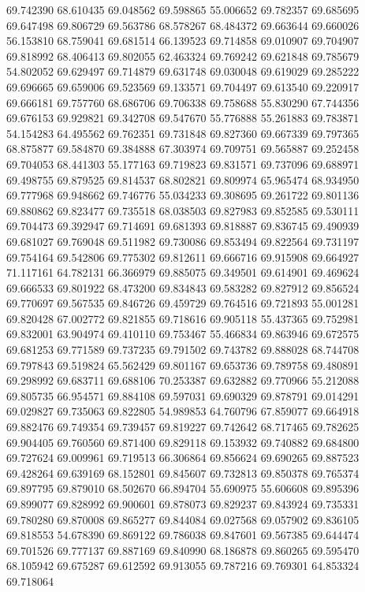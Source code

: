 69.742390
68.610435
69.048562
69.598865
55.006652
69.782357
69.685695
69.647498
69.806729
69.563786
68.578267
68.484372
69.663644
69.660026
56.153810
68.759041
69.681514
66.139523
69.714858
69.010907
69.704907
69.818992
68.406413
69.802055
62.463324
69.769242
69.621848
69.785679
54.802052
69.629497
69.714879
69.631748
69.030048
69.619029
69.285222
69.696665
69.659006
69.523569
69.133571
69.704497
69.613540
69.220917
69.666181
69.757760
68.686706
69.706338
69.758688
55.830290
67.744356
69.676153
69.929821
69.342708
69.547670
55.776888
55.261883
69.783871
54.154283
64.495562
69.762351
69.731848
69.827360
69.667339
69.797365
68.875877
69.584870
69.384888
67.303974
69.709751
69.565887
69.252458
69.704053
68.441303
55.177163
69.719823
69.831571
69.737096
69.688971
69.498755
69.879525
69.814537
68.802821
69.809974
65.965474
68.934950
69.777968
69.948662
69.746776
55.034233
69.308695
69.261722
69.801136
69.880862
69.823477
69.735518
68.038503
69.827983
69.852585
69.530111
69.704473
69.392947
69.714691
69.681393
69.818887
69.836745
69.490939
69.681027
69.769048
69.511982
69.730086
69.853494
69.822564
69.731197
69.754164
69.542806
69.775302
69.812611
69.666716
69.915908
69.664927
71.117161
64.782131
66.366979
69.885075
69.349501
69.614901
69.469624
69.666533
69.801922
68.473200
69.834843
69.583282
69.827912
69.856524
69.770697
69.567535
69.846726
69.459729
69.764516
69.721893
55.001281
69.820428
67.002772
69.821855
69.718616
69.905118
55.437365
69.752981
69.832001
63.904974
69.410110
69.753467
55.466834
69.863946
69.672575
69.681253
69.771589
69.737235
69.791502
69.743782
69.888028
68.744708
69.797843
69.519824
65.562429
69.801167
69.653736
69.789758
69.480891
69.298992
69.683711
69.688106
70.253387
69.632882
69.770966
55.212088
69.805735
66.954571
69.884108
69.597031
69.690329
69.878791
69.014291
69.029827
69.735063
69.822805
54.989853
64.760796
67.859077
69.664918
69.882476
69.749354
69.739457
69.819227
69.742642
68.717465
69.782625
69.904405
69.760560
69.871400
69.829118
69.153932
69.740882
69.684800
69.727624
69.009961
69.719513
66.306864
69.856624
69.690265
69.887523
69.428264
69.639169
68.152801
69.845607
69.732813
69.850378
69.765374
69.897795
69.879010
68.502670
66.894704
55.690975
55.606608
69.895396
69.899077
69.828992
69.900601
69.878073
69.829237
69.843924
69.735331
69.780280
69.870008
69.865277
69.844084
69.027568
69.057902
69.836105
69.818553
54.678390
69.869122
69.786038
69.847601
69.567385
69.644474
69.701526
69.777137
69.887169
69.840990
68.186878
69.860265
69.595470
68.105942
69.675287
69.612592
69.913055
69.787216
69.769301
64.853324
69.718064
